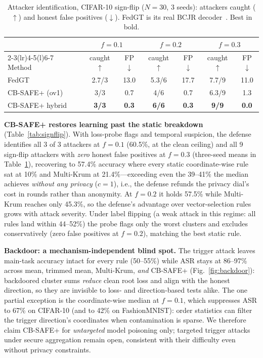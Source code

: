 \documentclass[lettersize,journal]{IEEEtran}
\begin{document}
\begin{table}[t]
\caption{Attacker identification, CIFAR-10 sign-flip ($N{=}30$, 3 seeds): attackers
caught ($\uparrow$) and honest false positives ($\downarrow$). FedGT is its real BCJR
decoder~\cite{fedgt}. Best in bold.}
\label{tab:detect}
\centering
\footnotesize
\setlength{\tabcolsep}{4pt}
\begin{tabular}{@{}lcccccc@{}}
\toprule
& \multicolumn{2}{c}{$f{=}0.1$} & \multicolumn{2}{c}{$f{=}0.2$} & \multicolumn{2}{c}{$f{=}0.3$}\\
\cmidrule(lr){2-3}\cmidrule(lr){4-5}\cmidrule(l){6-7}
Method & caught$\uparrow$ & FP$\downarrow$ & caught$\uparrow$ & FP$\downarrow$ & caught$\uparrow$ & FP$\downarrow$\\
\midrule
FedGT~\cite{fedgt}  & 2.7/3 & 13.0 & 5.3/6 & 17.7 & 7.7/9 & 11.0\\
CB-SAFE+ (ov1)   & 3/3 & 0.7 & 4/6 & 0.7 & 6.3/9 & 1.3\\
CB-SAFE+ hybrid  & \textbf{3/3} & \textbf{0.3} & \textbf{6/6} & \textbf{0.3} & \textbf{9/9} & \textbf{0.0}\\
\bottomrule
\end{tabular}
\end{table}

\textbf{CB-SAFE+ restores learning past the static breakdown}
(Table~\ref{tab:signflip}). With loss-probe
flags and temporal suspicion, the defense identifies all 3 of 3 attackers at
$f{=}0.1$ (60.5\%, at the clean ceiling) and all 9 sign-flip attackers
with \emph{zero} honest false positives at $f{=}0.3$ (three-seed means in Table~\ref{tab:detect}), recovering to 57.4\%
accuracy where every static coordinate-wise rule sat at 10\% and Multi-Krum at
21.4\%---exceeding even the 39--41\% the median achieves \emph{without any privacy}
($c{=}1$), i.e., the defense refunds the privacy dial's cost in rounds rather than
anonymity. At $f{=}0.2$ it holds 57.5\% while Multi-Krum reaches only 45.3\%, so the
defense's advantage over vector-selection rules grows with attack severity.
Under label flipping (a weak attack in this regime: all rules land within
44--52\%) the probe flags only the worst clusters and excludes conservatively (zero
false positives at $f{=}0.2$), matching the best static rule.

\textbf{Backdoor: a mechanism-independent blind spot.} The trigger attack leaves
main-task accuracy intact for every rule (50--55\%) while ASR stays at 86--97\%
across mean, trimmed mean, Multi-Krum, \emph{and} CB-SAFE+
(Fig.~\ref{fig:backdoor}): backdoored cluster sums \emph{reduce} clean root loss
and align with the honest direction, so they are invisible to loss- and
direction-based tests alike. The one partial exception is the coordinate-wise
median at $f{=}0.1$, which suppresses ASR to 67\% on CIFAR-10 (and to 42\% on
FashionMNIST): order statistics can filter the
trigger direction's coordinates when contamination is sparse. We therefore claim
CB-SAFE+ for \emph{untargeted} model poisoning only; targeted trigger attacks under
secure aggregation remain open, consistent with their difficulty even without
privacy constraints.
\end{document}

